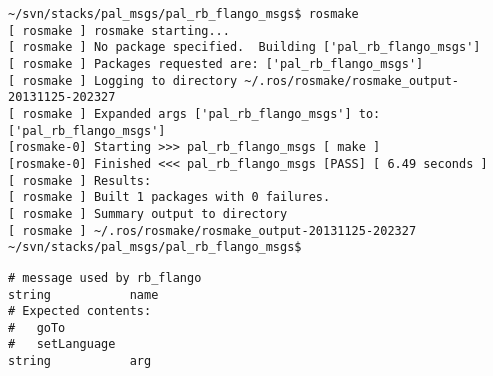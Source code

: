 \begin{lstlisting}[caption=Flango files layout, label=impl-ros-create-message]
~/svn/stacks/pal_msgs/pal_rb_flango_msgs$ rosmake
[ rosmake ] rosmake starting...                                                                                                                                                                                     
[ rosmake ] No package specified.  Building ['pal_rb_flango_msgs']                                                                                                                                                  
[ rosmake ] Packages requested are: ['pal_rb_flango_msgs']                                                                                                                                                          
[ rosmake ] Logging to directory ~/.ros/rosmake/rosmake_output-20131125-202327                                                                                                                    
[ rosmake ] Expanded args ['pal_rb_flango_msgs'] to:
['pal_rb_flango_msgs']                                                                                                                                         
[rosmake-0] Starting >>> pal_rb_flango_msgs [ make ]                                                                                                                                                                
[rosmake-0] Finished <<< pal_rb_flango_msgs [PASS] [ 6.49 seconds ]                                                                                                                                                 
[ rosmake ] Results:                                                                                                                                                                                                
[ rosmake ] Built 1 packages with 0 failures.                                                                                                                                                                       
[ rosmake ] Summary output to directory                                                                                                                                                                             
[ rosmake ] ~/.ros/rosmake/rosmake_output-20131125-202327                                                                                                                                         
~/svn/stacks/pal_msgs/pal_rb_flango_msgs$ 
\end{lstlisting}

\begin{lstlisting}[caption=Message type from robotBehaviour to Flango CM (rbFlango.msg), label=impl-flango-ros-message]
# message used by rb_flango
string           name
# Expected contents:
#   goTo
#   setLanguage
string           arg

\end{lstlisting}

